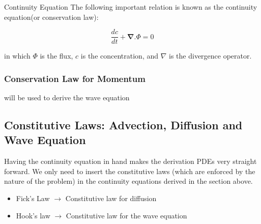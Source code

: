 \begin{definition}{Continuity Equation}
	The following important relation is known as the continuity equation(or conservation law):
	
	\begin{equation}
			\frac{dc}{dt} + \mathbf{\nabla} . \Phi = 0
	\end{equation}

	in which $\Phi$ is the flux, $c$ is the concentration, and $ \nabla $ is the divergence operator.
\end{definition}


\subsubsection{Conservation Law for Momentum}
will be used to derive the wave equation


\subsection{Constitutive Laws: Advection, Diffusion and Wave Equation}

Having the continuity equation in hand makes the derivation PDEs very straight forward. We only need to insert the constitutive laws (which are enforced by the nature of the problem) in the continuity equations derived in the section above.


\begin{itemize}
	\item Fick's Law $\rightarrow$ Constitutive law for diffusion 
	\item Hook's law $\rightarrow$ Constitutive law for the wave equation
\end{itemize}



